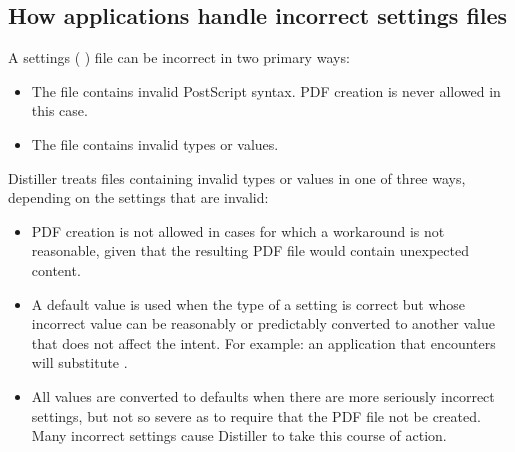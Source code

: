 \documentclass[letterpaper,12pt,english,openany,oneside]{sphinxmanual}
\begin{document}
\subsection{How applications handle incorrect settings files}
\label{\detokenize{index:how-applications-handle-incorrect-settings-files}}
A settings ( ) file can be incorrect in two primary ways:
\begin{itemize}
\item {} 
The file contains invalid PostScript syntax. PDF creation is never allowed in this case.

\item {} 
The file contains invalid types or values.

\end{itemize}

Distiller treats files containing invalid types or values in one of three ways, depending on the settings that are invalid:
\begin{itemize}
\item {} 
PDF creation is not allowed in cases for which a workaround is not reasonable, given that the resulting PDF file would contain unexpected content.

\item {} 
A default value is used when the type of a setting is correct but whose incorrect value can be reasonably or predictably converted to another value that does not affect the intent. For example: an application that encounters  will substitute  .

\item {} 
All values are converted to defaults when there are more seriously incorrect settings, but not so severe as to require that the PDF file not be created. Many incorrect settings cause Distiller to take this course of action.

\end{itemize}
\end{document}
